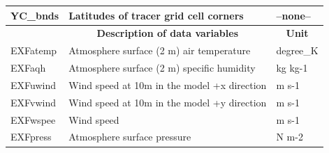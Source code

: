 \begin{longtable}{|m{}|m{}|m{}|}
YC\_bnds &Latitudes of tracer grid cell corners &--none--  \\ \hline
\rowcolor{lightgray} \multicolumn{1}{|c|}{\textbf{Variables}} & \multicolumn{1}{|c|}{\textbf{Description of data variables}} &  \multicolumn{1}{|c|}{\textbf{Unit}}\\ \hline
EXFatemp &Atmosphere surface (2 m) air temperature  &degree\_K  \\ \hline
EXFaqh &Atmosphere surface (2 m) specific humidity  &kg kg-1  \\ \hline
EXFuwind &Wind speed at 10m in the model +x direction &m s-1  \\ \hline
EXFvwind &Wind speed at 10m in the model +y direction &m s-1  \\ \hline
EXFwspee &Wind speed &m s-1  \\ \hline
EXFpress &Atmosphere surface pressure &N m-2  \\ \hline
\end{longtable}

\newp
\pagebreak

